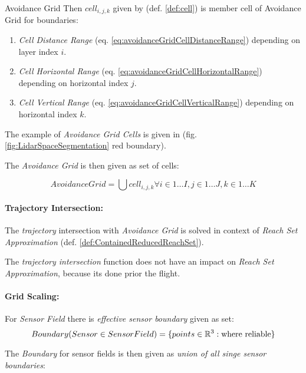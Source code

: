 \begin{definition}{Avoidance Grid}
\noindent Then $cell_{i,j,k}$ given by (def. \ref{def:cell}) is member cell of Avoidance Grid for boundaries:
\begin{enumerate}
    \item \emph{Cell Distance Range} (eq. \ref{eq:avoidanceGridCellDistanceRange}) depending on layer index $i$.
    
    \item \emph{Cell Horizontal Range} (eq. \ref{eq:avoidanceGridCellHorizontalRange}) depending on horizontal index $j$.
    
    \item \emph{Cell Vertical Range} (eq. \ref{eq:avoidanceGridCellVerticalRange}) depending on horizontal index $k$.
\end{enumerate}

\noindent The example of \emph{Avoidance Grid Cells} is given in (fig. \ref{fig:LidarSpaceSegmentation} red boundary). 

The \emph{Avoidance Grid} is then given as set of cells:

\begin{equation}\label{eq:avoidanceGridCellSpace}
    Avoidance Grid = \bigcup cell_{i,j,k} \forall i \in 1\dots I, j\in 1\dots J, k\in 1\dots K
\end{equation}
\end{definition}

\paragraph{Trajectory Intersection:} The \emph{trajectory} intersection with \emph{Avoidance Grid} is solved in context of \emph{Reach Set Approximation} (def. \ref{def:ContainedReducedReachSet}). 
\begin{note}
    The \emph{trajectory intersection} function does not have an impact on \emph{Reach Set Approximation}, because its done prior the flight.
\end{note}


\paragraph{Grid Scaling:} For \emph{Sensor Field} there is \emph{effective sensor boundary} given as set:
\begin{equation}
    Boundary(Sensor \in Sensor Field) = \{points \in \mathbb{R}^3: \text{where reliable}\}
\end{equation}

\noindent The \emph{Boundary} for sensor fields is then given as \emph{union of all singe sensor boundaries}:


